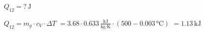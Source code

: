 \( Q_{12} = ? \, \text{J} \)  

\( Q_{12} = m_g \cdot c_V \cdot \Delta T \)  
\( = 3.68 \cdot 0.633 \, \frac{\text{kJ}}{\text{kg·K}} \cdot (500 - 0.003 \, \text{°C}) \)  
\( = 1.13 \, \text{kJ} \)